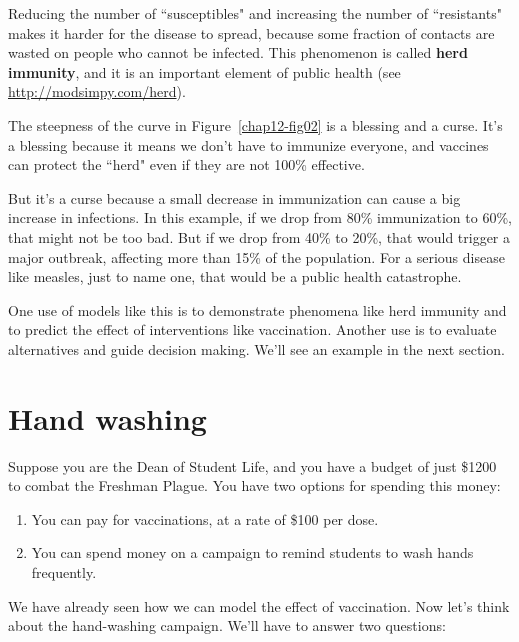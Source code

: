 \documentclass[12pt]{book}
\theoremstyle{exercise}
\begin{document}
Reducing the number of ``susceptibles" and increasing the number of ``resistants" makes it harder for the disease to spread, because some fraction of contacts are wasted on people who cannot be infected.  This phenomenon is called {\bf herd immunity}, and it is an important element of public health (see \url{http://modsimpy.com/herd}).


The steepness of the curve in Figure~\ref{chap12-fig02} is a blessing and a curse.  It's a blessing because it means we don't have to immunize everyone, and vaccines can protect the ``herd" even if they are not 100\% effective.

But it's a curse because a small decrease in immunization can cause a big increase in infections.  In this example, if we drop from 80\% immunization to 60\%, that might not be too bad.  But if we drop from 40\% to 20\%, that would trigger a major outbreak, affecting more than 15\% of the population.  For a serious disease like measles, just to name one, that would be a public health catastrophe.


One use of models like this is to demonstrate phenomena like herd immunity and to predict the effect of interventions like vaccination.  Another use is to evaluate alternatives and guide decision making.  We'll see an example in the next section.





\section{Hand washing}

Suppose you are the Dean of Student Life, and you have a budget of just \$1200 to combat the Freshman Plague.  You have two options for spending this money:

\begin{enumerate}

\item You can pay for vaccinations, at a rate of \$100 per dose.

\item You can spend money on a campaign to remind students to wash hands frequently.

\end{enumerate}

We have already seen how we can model the effect of vaccination.  Now let's think about the hand-washing campaign.  We'll have to answer two questions:
\end{document}
